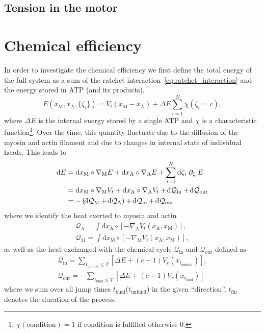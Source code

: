 \documentclass[aps,pre,twocolumn,showpacs,showkeys]{revtex4-1}
\newcommand{\rmd}{{\mathrm d}}
\newcommand{\dbar}{{\mathchar '26 \mkern-11mu {\mathrm d}}}
\begin{document}
\subsection{Tension in the motor}



\section{Chemical efficiency}
\label{sec:energie}
In order to investigate the chemical efficiency 
we first define the total energy of the full system as a sum of the ratchet interaction~\eqref{eq:ratchet_interaction}
and the energy stored in ATP (and its products), 
\begin{equation*}
E( x_\text{M}, x_\text{A}, \{ \zeta_i \}) = V_t( x_\text{M} - x_\text{A} ) + \Delta E \sum\limits_{i=1}^N \chi( \zeta_i = c ) ,
\end{equation*}
where $\Delta E$ is the internal energy stored by a single ATP and $\chi$ is a characteristic function\footnote{
$\chi(\text{condition}) = 1$ if condition is fulfilled otherwise $0$.
}.
Over the time, this quantity fluctuate due to the diffusion of the myosin and actin filament and due to changes in internal state of individual heads.
This leads to 
\begin{align}
\rmd E 
&= \rmd x_\text{M} \circ \nabla_\text{M} E  
+ \rmd x_\text{A} \circ \nabla_\text{A} E 
+ \sum\limits_{i=1}^N \rmd \zeta_i \; \partial_{\zeta_i} E  
\nonumber \\
&= \rmd x_\text{M} \circ \nabla_\text{M} V_t  
+ \rmd x_\text{A} \circ \nabla_\text{A} V_t 
+ \dbar {\mathcal Q}_\text{in} 
+ \dbar {\mathcal Q}_\text{out} 
\nonumber \\
&= - \left( \dbar {\mathcal Q}_\text{M} + \dbar {\mathcal Q}_\text{A} \right) 
+ \dbar {\mathcal Q}_{\text{in}} 
+ \dbar {\mathcal Q}_{\text{out}}
\end{align}
where we identify the heat  exerted to myosin and actin 
\begin{gather*}
{\mathcal Q}_\text{A} 
= \int \rmd x_\text{A} \circ \left[ - \nabla_\text{A} V_t( x_\text{A}, x_\text{M} ) \right], \\
{\mathcal Q}_\text{M} 
= \int \rmd x_\text{M} \circ \left[ - \nabla_\text{M} V_t( x_\text{A}, x_\text{M} ) \right],
\end{gather*}
as well as the heat exchanged with the chemical cycle $\mathcal Q_\text{in}$ and $\mathcal Q_\text{out}$ defined as 
\begin{gather}
{\mathcal Q}_\text{in} = \sum_{t_\text{unbind} \leq T} \left[ \Delta E + (c-1) V_r(x_{t_\text{unbind}}) \right] , 
\label{q_in} \\
{\mathcal Q}_\text{out} = -\sum_{t_\text{bind} \leq T} \left[ \Delta E + (c-1) V_r(x_{t_\text{bind}}) \right] 
\label{q_out}
\end{gather}
where we sum over all jump times $t_\text{bind}$($t_\text{unbind}$) in the given ``direction''. 
$t_\text{fin}$ denotes the duration of the process. 
\end{document}
